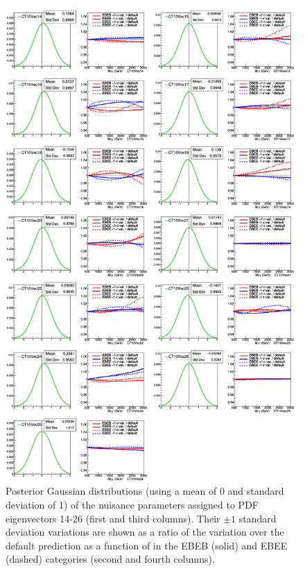 \begin{figure}[!htbp]
	\centering
	\includegraphics[scale=0.26]{figures/Multi_PDFs_B.pdf}
	\caption{Posterior Gaussian distributions (using a mean of 0 and standard deviation of 1) of the nuisance parameters assigned to PDF eigenvectors 14-26 (first and third columns). Their $\pm1$ standard deviation variations are shown as a ratio of the variation over the default prediction as a function of \mgg in the EBEB (solid) and EBEE (dashed) categories (second and fourth columns).}
	\label{fig:Multi_PDFs_B}
\end{figure}

